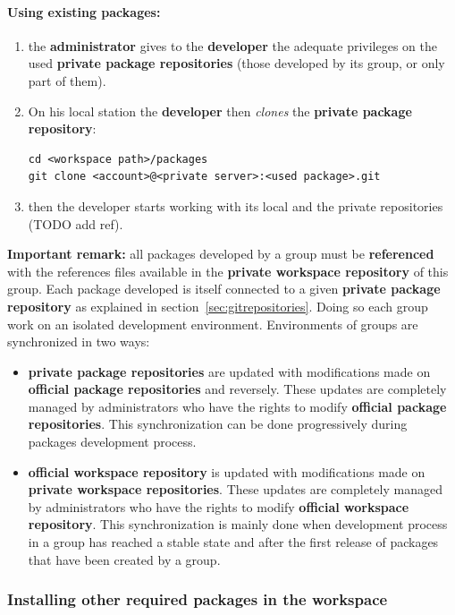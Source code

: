 \documentclass[12pt,a4paper]{article}
\begin{document}
\paragraph{Using existing packages:}
\begin{enumerate}
\item the \textbf{administrator} gives to the \textbf{developer} the adequate privileges on the used \textbf{private package repositories} (those developed by its group, or only part of them).
\item On his local station the \textbf{developer} then \textit{clones} the \textbf{private package repository}:
\begin{verbatim}
cd <workspace path>/packages
git clone <account>@<private server>:<used package>.git
\end{verbatim}
\item then the developer starts working with its local and the private repositories (TODO add ref).
\end{enumerate}
 
\textbf{Important remark:} all packages developed by a group must be \textbf{referenced} with the references files available in the \textbf{private workspace repository} of this group. Each package developed is itself connected to a given \textbf{private package repository} as explained in section~\ref{sec:gitrepositories}. Doing so each group work on an isolated development environment. Environments of groups are synchronized in two ways:
\begin{itemize}
\item \textbf{private package repositories} are updated with modifications made on \textbf{official package repositories} and reversely. These updates are completely managed by administrators who have the rights to modify \textbf{official package repositories}. This synchronization can be done progressively during packages development process.
\item \textbf{official workspace repository} is updated with modifications made on \textbf{private workspace repositories}. These updates are completely managed by administrators who have the rights to modify \textbf{official workspace repository}. This synchronization is mainly done when development process in a group has reached a stable state and after the first release of packages that have been created by a group.
\end{itemize}

\subsubsection{Installing other required packages in the workspace}
\end{document}
